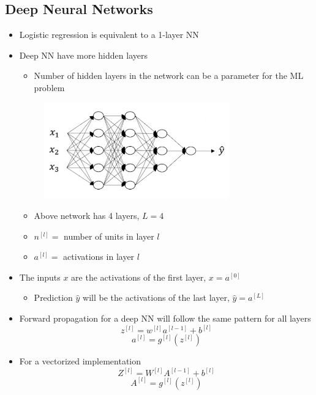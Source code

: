 \documentclass[12pt, letterpaper]{article}
\begin{document}
    \subsection{Deep Neural Networks}
    \begin{itemize}
        \item Logistic regression is equivalent to a 1-layer NN
        \item Deep NN have more hidden layers
        \begin{itemize}
            \item Number of hidden layers in the network can be a parameter for the ML problem
        \end{itemize}
        
        \vspace{25mm}
        \begin{figure}[ht]
            \centering
            \includegraphics[width=8cm]{11.png}
        \end{figure}
        \begin{itemize}
            \item Above network has 4 layers, $L=4$
            \item $n^{[l]}=$ number of units in layer $l$
            \item $a^{[l]}=$ activations in layer $l$
        \end{itemize}
        \item The inputs $x$ are the activations of the first layer, $x=a^{[0]}$
        \begin{itemize}
            \item Prediction $\hat{y}$ will be the activations of the last layer, $\hat{y}=a^{[L]}$
        \end{itemize}
        \item Forward propagation for a deep NN will follow the same pattern for all layers
        $$z^{[l]}=w^{[l]}a^{[l-1]}+b^{[l]}$$
        $$a^{[l]}=g^{[l]}(z^{[l]})$$
        \item For a vectorized implementation
        $$Z^{[l]}=W^{[l]}A^{[l-1]}+b^{[l]}$$
        $$A^{[l]}=g^{[l]}(z^{[l]})$$

\end{itemize}
\end{document}
